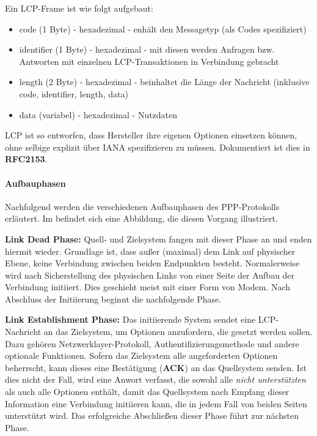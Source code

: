Ein LCP-Frame ist wie folgt aufgebaut:
\begin{itemize}
	\item code (1 Byte) - hexadezimal - enhält den Messagetyp (als Codes spezifiziert)
	\item identifier (1 Byte) - hexadezimal - mit diesen werden Anfragen bzw. Antworten mit einzelnen LCP-Transaktionen in Verbindung gebracht
	\item length (2 Byte) - hexadezimal - beinhaltet die Länge der Nachricht (inklusive code, identifier, length, data)
	\item data (variabel) - hexadezimal - Nutzdaten
\end{itemize}

\ac{LCP} ist so entworfen, dass Hersteller ihre eigenen Optionen einsetzen können, ohne
selbige explizit über \ac{IANA} spezifizieren zu müssen. Dokumentiert ist dies in \textbf{RFC2153}.

\paragraph{Aufbauphasen} Nachfolgend werden die verschiedenen Aufbauphasen des
PPP-Protokolls erläutert. Im  befindet
sich eine Abbildung, die diesen Vorgang illustriert.

\textbf{Link Dead Phase:}
Quell- und Zielsystem fangen mit dieser Phase an und enden hiermit wieder.
Grundlage ist, dass außer (maximal) dem Link auf physischer Ebene,
keine Verbindung zwischen beiden Endpunkten besteht. Normalerweise
wird nach Sicherstellung des physischen Links von einer Seite der
Aufbau der Verbindung initiiert. Dies geschieht meist mit einer Form von Modem.
Nach Abschluss der Initiierung beginnt die nachfolgende Phase.

\textbf{Link Establishment Phase:}
Das initiierende System sendet eine \ac{LCP}-Nachricht an das Zielsystem,
um Optionen anzufordern, die gesetzt werden sollen. Dazu gehören
Netzwerklayer-Protokoll, Authentifizierungsmethode und andere optionale
Funktionen. Sofern das Zielsystem alle angeforderten Optionen beherrscht,
kann dieses eine Bestätigung (\textbf{ACK}) an das Quellsystem senden.
Ist dies nicht der Fall, wird eine Anwort verfasst, die sowohl alle
\textit{nicht unterstützten} als auch alle  Optionen
enthält, damit das Quellsystem nach Empfang dieser Information eine
Verbindung initiieren kann, die in jedem Fall von beiden Seiten unterstützt
wird. Das erfolgreiche Abschließen dieser Phase führt zur nächsten Phase.

